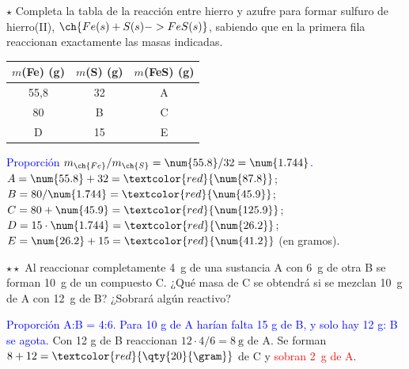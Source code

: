 \begin{exercise}
    \(\star\) Completa la tabla de la reacción entre hierro y azufre para formar sulfuro de hierro(II),
    \(\ch{Fe(s) + S(s) -> FeS(s)}\), sabiendo que en la primera fila reaccionan exactamente las masas indicadas.
    \begin{center}
        \begin{tabular}{@{}ccc@{}}
            \toprule
            \(m\)\textbf{(Fe) (g)} & \(m\)\textbf{(S) (g)} & \(m\)\textbf{(FeS) (g)} \\
            \midrule
            55,8 & 32 & A \\[3pt]
            80 & B & C \\[3pt]
            D & 15 & E \\
            \bottomrule
        \end{tabular}
    \end{center}
    \begin{solu}
        \textcolor{blue}{Proporción \(m_{\ch{Fe}}/m_{\ch{S}} = \num{55.8}/32 = \num{1.744}\).}
        \(A = \num{55.8} + 32 = \textcolor{red}{\num{87.8}}\); \(B = 80/\num{1.744} = \textcolor{red}{\num{45.9}}\);
        \(C = 80 + \num{45.9} = \textcolor{red}{\num{125.9}}\); \(D = 15 \cdot \num{1.744} = \textcolor{red}{\num{26.2}}\);
        \(E = \num{26.2} + 15 = \textcolor{red}{\num{41.2}}\) (en gramos).
    \end{solu}
\end{exercise}

\begin{exercise}
    \(\star\star\) Al reaccionar completamente \qty{4}{\gram} de una sustancia A con \qty{6}{\gram} de otra B se forman
    \qty{10}{\gram} de un compuesto C. ¿Qué masa de C se obtendrá si se mezclan \qty{10}{\gram} de A con \qty{12}{\gram} de B?
    ¿Sobrará algún reactivo?
    \begin{solu}
        \textcolor{blue}{Proporción A:B = 4:6. Para 10 g de A harían falta 15 g de B, y solo hay 12 g: B se agota.} Con 12 g de B
        reaccionan \(12 \cdot 4/6 = \qty{8}{\gram}\) de A. Se forman \(8 + 12 = \textcolor{red}{\qty{20}{\gram}}\) de C y
        \textcolor{red}{sobran \qty{2}{\gram} de A}.
    \end{solu}
\end{exercise}

